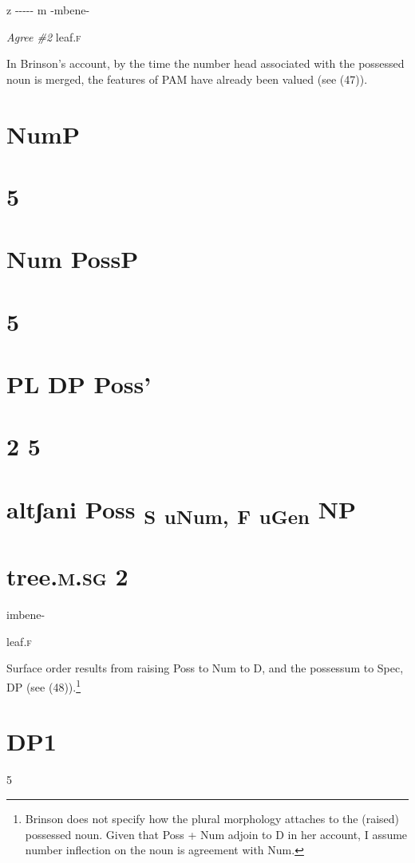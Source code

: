 \documentclass[output=paper
,modfonts
,nonflat]{langsci/langscibook}
\begin{document}
z {}-{}-{}-{}-{}- m       {}-mbene-

\textit{Agree  \#2} leaf.\textsc{f}

In Brinson's account, by the time the number head associated with the possessed noun is merged, the features of PAM have already been valued (see (47)).

\section{        NumP}
\label{bkm:Ref488163441}\section{     5}
\section{      Num           PossP}
\section{         {\textbar}       5}
\section{         PL      DP           Poss'}
\section{               2    5}
\section{              altʃani  Poss \textsubscript{S} \textsubscript{uNum}\textsubscript{,} \textsubscript{F} \textsubscript{uGen}\textsubscript{}    NP}
\section{            tree.\textsc{m.sg} 2}

imbene-

leaf.\textsc{f}

Surface order results from raising Poss to Num to D, and the possessum to Spec, DP (see (48)).\footnote{Brinson does not specify how the plural morphology attaches to the (raised) possessed noun. Given that Poss + Num adjoin to D in her account, I assume number inflection on the noun is agreement with Num.} 

\section{            DP1} 
\label{bkm:Ref488168546}
5
\end{document}

